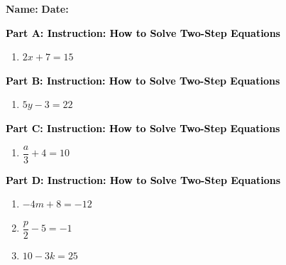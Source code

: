 \documentclass[12pt, letterpaper, fleqn]{article}
\begin{document}
\textbf{Name:} \underline{\hspace{5cm}}
\hfill
\textbf{Date:} \underline{\hspace{3cm}}\\

\begin{tcolorbox}[colback=customteal!20]
\large\textcolor{black}{\textbf{Part A: Instruction: How to Solve Two-Step Equations}}
\end{tcolorbox}

\vspace{3mm}

\begin{enumerate}[itemsep=2.2cm, leftmargin=0.6cm]
\item $2x + 7 = 15$
\end{enumerate}

\newpage

\begin{tcolorbox}[colback=customteal!20]
\large\textcolor{black}{\textbf{Part B: Instruction: How to Solve Two-Step Equations}}
\end{tcolorbox}

\vspace{3mm}

\begin{enumerate}[itemsep=2.2cm, leftmargin=0.6cm, resume]
\item $5y - 3 = 22$
\end{enumerate}

\newpage

\begin{tcolorbox}[colback=customteal!20]
\large\textcolor{black}{\textbf{Part C: Instruction: How to Solve Two-Step Equations}}
\end{tcolorbox}

\vspace{3mm}

\begin{enumerate}[itemsep=2.2cm, leftmargin=0.6cm, resume]
\item $\dfrac{a}{3} + 4 = 10$
\end{enumerate}

\newpage

\begin{tcolorbox}[colback=customteal!20]
\large\textcolor{black}{\textbf{Part D: Instruction: How to Solve Two-Step Equations}}
\end{tcolorbox}

\vspace{3mm}

\begin{enumerate}[itemsep=2.2cm, leftmargin=0.6cm, resume]
\item $-4m + 8 = -12$
\item $\dfrac{p}{2} - 5 = -1$
\item $10 - 3k = 25$
\end{enumerate}
\end{document}
